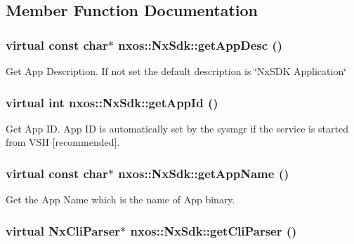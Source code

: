 \subsection{Member Function Documentation}
\hypertarget{classnxos_1_1NxSdk_ad6964fa8ee52a8b0a22c27abdcf871e3}{
\subsubsection[{getAppDesc}]{\setlength{\rightskip}{0pt plus 5cm}virtual const char$\ast$ nxos::NxSdk::getAppDesc ()}}
\label{classnxos_1_1NxSdk_ad6964fa8ee52a8b0a22c27abdcf871e3}
Get App Description. If not set the default description is \char`\"{}NxSDK Application\char`\"{} \hypertarget{classnxos_1_1NxSdk_ac82af6d262439275f27c745082bf3fd7}{
\subsubsection[{getAppId}]{\setlength{\rightskip}{0pt plus 5cm}virtual int nxos::NxSdk::getAppId ()}}
\label{classnxos_1_1NxSdk_ac82af6d262439275f27c745082bf3fd7}
Get App ID. App ID is automatically set by the sysmgr if the service is started from VSH \mbox{[}recommended\mbox{]}. \hypertarget{classnxos_1_1NxSdk_a9ba7da2cd8cb4f82438135ee651efdb0}{
\subsubsection[{getAppName}]{\setlength{\rightskip}{0pt plus 5cm}virtual const char$\ast$ nxos::NxSdk::getAppName ()}}
\label{classnxos_1_1NxSdk_a9ba7da2cd8cb4f82438135ee651efdb0}
Get the App Name which is the name of App binary. \hypertarget{classnxos_1_1NxSdk_a98bcb70d1bf60e38b41eacdf0a72dc89}{
\subsubsection[{getCliParser}]{\setlength{\rightskip}{0pt plus 5cm}virtual {\bf NxCliParser}$\ast$ nxos::NxSdk::getCliParser ()}}
